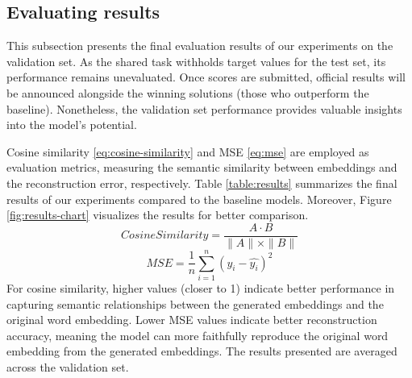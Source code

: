 \documentclass[12pt]{article}
\begin{document}
\newpage

\subsection{Evaluating results}

This subsection presents the final evaluation results of our experiments on the validation set. As the shared task withholds target values for the test set, its performance remains unevaluated. Once scores are submitted, official results will be announced alongside the winning solutions (those who outperform the baseline). Nonetheless, the validation set performance provides valuable insights into the model's potential.

Cosine similarity \ref{eq:cosine-similarity} and MSE \ref{eq:mse} are employed as evaluation metrics, measuring the semantic similarity between embeddings and the reconstruction error, respectively. Table \ref{table:results} summarizes the final results of our experiments compared to the baseline models. Moreover, Figure \ref{fig:results-chart} visualizes the results for better comparison.
\begin{equation}\label{eq:cosine-similarity}
    Cosine Similarity = \frac{A \cdot B}{\|A\| \times \|B\|}
\end{equation}
\begin{equation}\label{eq:mse}
    MSE = \frac{1}{n} \sum_{i=1}^{n} (y_i - \hat{y_i})^2
\end{equation}
For cosine similarity, higher values (closer to 1) indicate better performance in capturing semantic relationships between the generated embeddings and the original word embedding. Lower MSE values indicate better reconstruction accuracy, meaning the model can more faithfully reproduce the original word embedding from the generated embeddings. The results presented are averaged across the validation set.
\end{document}
